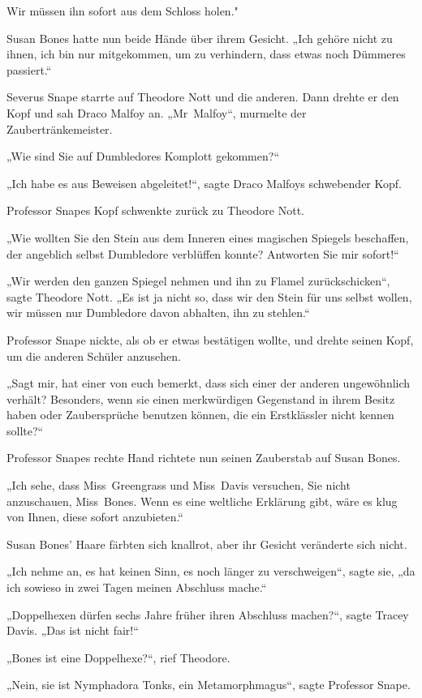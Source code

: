 {Wir müssen ihn sofort aus dem Schloss holen."

Susan Bones hatte nun beide Hände über ihrem Gesicht. „Ich gehöre nicht zu ihnen, ich bin nur mitgekommen, um zu verhindern, dass etwas noch Dümmeres passiert.“

Severus Snape starrte auf Theodore Nott und die anderen. Dann drehte er den Kopf und sah Draco Malfoy an. „Mr~Malfoy“, murmelte der Zaubertränkemeister.

„Wie sind Sie auf Dumbledores Komplott gekommen?“

„Ich habe es aus Beweisen abgeleitet!“, sagte Draco Malfoys schwebender Kopf.

Professor Snapes Kopf schwenkte zurück zu Theodore Nott.

„Wie wollten Sie den Stein aus dem Inneren eines magischen Spiegels beschaffen, der angeblich selbst Dumbledore verblüffen konnte? Antworten Sie mir sofort!“

„Wir werden den ganzen Spiegel nehmen und ihn zu Flamel zurückschicken“, sagte Theodore Nott. „Es ist ja nicht so, dass wir den Stein für uns selbst wollen, wir müssen nur Dumbledore davon abhalten, ihn zu stehlen.“

Professor Snape nickte, als ob er etwas bestätigen wollte, und drehte seinen Kopf, um die anderen Schüler anzusehen.

„Sagt mir, hat einer von euch bemerkt, dass sich einer der anderen ungewöhnlich verhält? Besonders, wenn sie einen merkwürdigen Gegenstand in ihrem Besitz haben oder Zaubersprüche benutzen können, die ein Erstklässler nicht kennen sollte?“

Professor Snapes rechte Hand richtete nun seinen Zauberstab auf Susan Bones.

„Ich sehe, dass Miss~Greengrass und Miss~Davis versuchen, Sie nicht anzuschauen, Miss~Bones. Wenn es eine weltliche Erklärung gibt, wäre es klug von Ihnen, diese sofort anzubieten.“

Susan Bones' Haare färbten sich knallrot, aber ihr Gesicht veränderte sich nicht.

„Ich nehme an, es hat keinen Sinn, es noch länger zu verschweigen“, sagte sie, „da ich sowieso in zwei Tagen meinen Abschluss mache.“

„Doppelhexen dürfen sechs Jahre früher ihren Abschluss machen?“, sagte Tracey Davis. „Das ist nicht fair!“

„Bones ist eine Doppelhexe?“, rief Theodore.

„Nein, sie ist Nymphadora Tonks, ein Metamorphmagus“, sagte Professor Snape.

}
